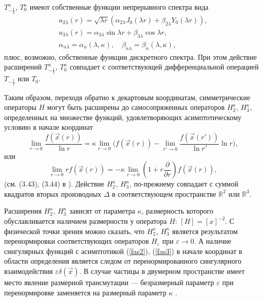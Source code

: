 \documentclass[12pt]{article}
\newcommand{\RR}{\mathbb{R}}
\newcommand{\ve}{\varepsilon}
\begin{document}
$ T_{-\frac{1}{2}}^{\kappa} $,
$ T_{0}^{\kappa} $
    имеют собственные функции непрерывного спектра вида
\begin{gather*}
    u_{2\lambda}(r) = \sqrt{\lambda r} (\alpha_{2\lambda} J_{0}(\lambda r)
	+ \beta_{2\lambda} Y_{0}(\lambda r)) , \\
    u_{3\lambda}(r) = \alpha_{3\lambda} \sin \lambda r
	+ \beta_{3\lambda} \cos\lambda r , \\
    \alpha_{n\lambda} = \alpha_{n}(\lambda,\kappa), \quad
    \beta_{n\lambda} = \beta_{n}(\lambda,\kappa),
\end{gather*}
    плюс, возможно, собственные функции дискретного спектра.
    При этом действие расширений
$ T_{-\frac{1}{2}}^{\kappa} $,
$ T_{0}^{\kappa} $
    совпадает с соответствующей дифференциальной операцией
$ T_{-\frac{1}{2}} $ или
$ T_{0} $.

    Таким образом, переходя обратно к декартовым координатам,
    симметрические операторы
$ H $
    могут быть расширены до самосопряженных операторов
$ H_{2}^{\kappa} $, 
$ H_{3}^{\kappa} $, определенных
    на множестве функций, удовлетворяющих асимптотическому условию
    в начале координат
\begin{equation}
\label{fas2}
    \lim_{r\to 0} \frac{f(\vec{x}(r))}{\ln r} = \kappa \lim_{r\to 0}\bigl(
	f(\vec{x}(r)) -\lim_{r'\to 0} \frac{f(\vec{x}(r'))}{\ln r'} \ln r
    \bigr) ,
\end{equation}
    или
\begin{equation}
\label{fas3}
    \lim_{r\to 0} rf(\vec{x}(r)) = -\kappa \lim_{r\to 0}(
	1 + r \frac{\partial}{\partial r} ) f(\vec{x}(r)) ,
\end{equation}
    (см. (3.43), (3.44) в
\cite{Jackiw}).
    Действие 
$ H_{2}^{\kappa} $,
$ H_{3}^{\kappa} $,
    по-прежнему совпадает с суммой квадратов вторых производных
$ \Delta $ в соответствующем пространстве
$ \RR^{2} $ или
$ \RR^{3} $.

    Расширения
$ H_{2}^{\kappa} $,
$ H_{3}^{\kappa} $
    зависят от параметра
$ \kappa $,
    размерность которого обуславливается наличием размерности у оператора
$ H $:
$ [H] = [x]^{-2} $.
    С физической точки зрения можно сказать, что
$ H_{2}^{\kappa} $,
$ H_{3}^{\kappa} $
    является результатом перенормировки соответствующих операторов
$ H_{\ve} $
    при
$ \ve \to 0 $.
    А наличие сингулярных функций с асимптотикой
(\ref{fas2}),
(\ref{fas3})
    в начале координат в области определения является следом от
    перенормированного сингулярного взаимодействия
$ \ve \delta(\vec{x}) $.
    В случае частицы в двумерном пространстве имеет место явление
    размерной трансмутации --- безразмерный параметр
$ \ve $
    при перенормировке заменяется на размерный параметр
$ \kappa $
\cite{LFres}.
\end{document}
